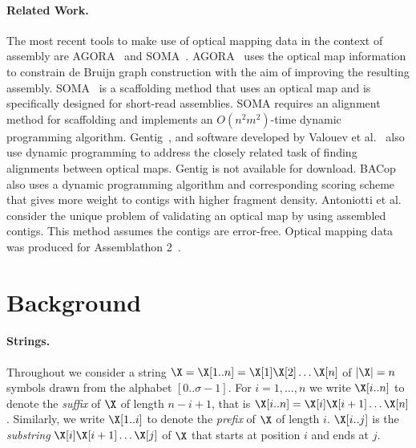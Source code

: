 \documentclass[doctor]{thesis}
\begin{document}
\paragraph{Related Work.}
The most recent tools to make use of optical mapping data in the context of assembly are AGORA~\cite{agora} and SOMA~\cite{Nagarajan08}. AGORA~\cite{agora} uses the optical map information to constrain de Bruijn graph construction with the aim of improving the resulting assembly. SOMA~\cite{Nagarajan08} is a scaffolding method that uses an optical map and is specifically designed for short-read assemblies. SOMA requires an alignment method for scaffolding and implements an $O(n^2 m^2)$-time dynamic programming algorithm. Gentig~\cite{Anantharaman01}, and software developed by Valouev et al.~\cite{Valouev06} also use dynamic programming to address the closely related task of finding alignments between optical maps. Gentig is not available for download.  BACop~\cite{Zhou09} also uses a dynamic programming algorithm and corresponding scoring scheme that gives more weight to contigs with higher fragment density. Antoniotti et al.~\cite{antoniotti} consider the unique problem of validating an optical map by using assembled contigs. This method assumes the contigs are error-free. Optical mapping data was produced for Assemblathon 2~\cite{bradnam2013assemblathon}.














 
\makeatletter{}\section{Background}
\label{sec-background}

\paragraph{Strings.}
Throughout we consider a string $\X = \X[1..n] = \X[1]\X[2]\ldots
\X[n]$ of $|\X| = n$ symbols drawn from the alphabet $[0..\sigma-1]$.
For $i=1,\ldots,n$ we
write $\X[i..n]$ to denote the {\em suffix} of $\X$ of length $n-i+1$,
that is $\X[i..n] = \X[i]\X[i+1]\ldots \X[n]$.  
Similarly, we write
$\X[1..i]$ to denote the {\em prefix} of $\X$ of length $i$.
$\X[i..j]$ is the {\em substring} $\X[i]\X[i+1]\ldots \X[j]$ of $\X$
that starts at position $i$ and ends at $j$. 
\end{document}
